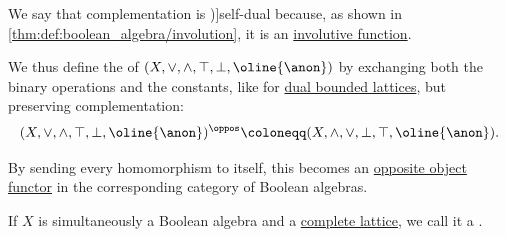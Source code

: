 \begin{definition}
\begin{thmenum}
    \mimprovised We say that complementation is \term[en=self-dual (\cite[193]{Gottschalk1953Quaternality})]{self-dual} because, as shown in \cref{thm:def:boolean_algebra/involution}, it is an \hyperref[def:set_involution]{involutive function}.

    We thus define the  of \( (X, \vee, \wedge, \top, \bot, \oline{\anon}) \) by exchanging both the binary operations and the constants, like for \hyperref[def:bounded_lattice/opposite]{dual bounded lattices}, but preserving complementation:
    \begin{equation*}
      (X, \vee, \wedge, \top, \bot, \oline{\anon})^\oppos \coloneqq (X, \wedge, \vee, \bot, \top, \oline{\anon}).
    \end{equation*}

    By sending every homomorphism to itself, this becomes an \hyperref[con:opposite_object]{opposite object functor} in the corresponding category of Boolean algebras.

     If \( X \) is simultaneously a Boolean algebra and a \hyperref[def:complete_lattice]{complete lattice}, we call it a .
  \end{thmenum}
\end{definition}
